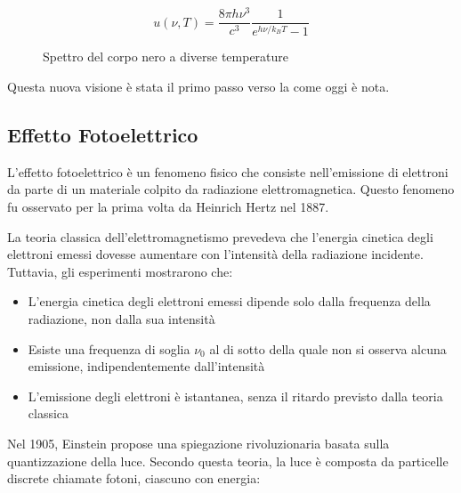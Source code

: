 \[
	u(\nu,T) = \frac{8\pi h\nu^3}{c^3}\frac{1}{e^{h\nu/k_BT}-1}
\]

\begin{figure}[h]
\centering
{}
\caption{Spettro del corpo nero a diverse temperature}
\end{figure}

Questa nuova visione è stata il primo passo verso la \MQ come oggi è nota.

\subsection{Effetto Fotoelettrico} 
L'effetto fotoelettrico è un fenomeno fisico che consiste nell'emissione di elettroni da parte di un materiale colpito da radiazione elettromagnetica. Questo fenomeno fu osservato per la prima volta da Heinrich Hertz nel 1887.

La teoria classica dell'elettromagnetismo prevedeva che l'energia cinetica degli elettroni emessi dovesse aumentare con l'intensità della radiazione incidente. Tuttavia, gli esperimenti mostrarono che:

\begin{itemize}
	\item L'energia cinetica degli elettroni emessi dipende solo dalla frequenza della radiazione, non dalla sua intensità
	\item Esiste una frequenza di soglia $\nu_0$ al di sotto della quale non si osserva alcuna emissione, indipendentemente dall'intensità
	\item L'emissione degli elettroni è istantanea, senza il ritardo previsto dalla teoria classica
\end{itemize}

Nel 1905, Einstein propose una spiegazione rivoluzionaria basata sulla quantizzazione della luce. Secondo questa teoria, la luce è composta da particelle discrete chiamate fotoni, ciascuno con energia:

